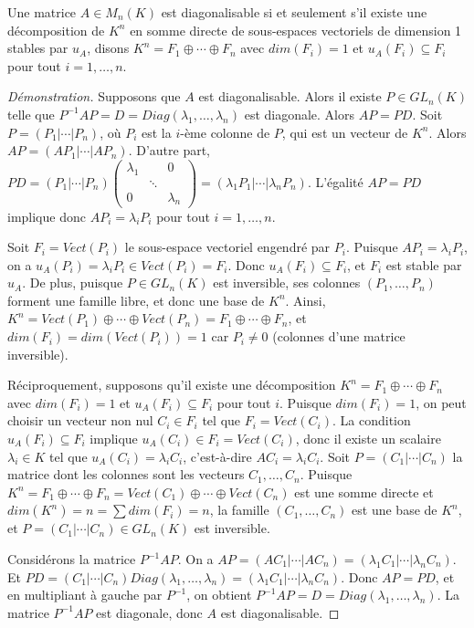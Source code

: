 \documentclass{article}
\begin{document}
\begin{corollaire}
Une matrice $A \in M_n(K)$ est diagonalisable si et seulement s'il existe une décomposition de $K^n$ en somme directe de sous-espaces vectoriels de dimension 1 stables par $u_A$, disons $K^n = F_1 \oplus \cdots \oplus F_n$ avec $dim(F_i) = 1$ et $u_A(F_i) \subseteq F_i$ pour tout $i=1, \ldots, n$.
\end{corollaire}

\begin{proof}[Démonstration]
Supposons que $A$ est diagonalisable. Alors il existe $P \in GL_n(K)$ telle que $P^{-1}AP = D = Diag(\lambda_1, \ldots, \lambda_n)$ est diagonale. Alors $AP = PD$.
Soit $P = (P_1 | \cdots | P_n)$, où $P_i$ est la $i$-ème colonne de $P$, qui est un vecteur de $K^n$. Alors $AP = (AP_1 | \cdots | AP_n)$. D'autre part, $PD = (P_1 | \cdots | P_n) \begin{pmatrix} \lambda_1 & & 0 \\ & \ddots & \\ 0 & & \lambda_n \end{pmatrix} = (\lambda_1 P_1 | \cdots | \lambda_n P_n)$.
L'égalité $AP = PD$ implique donc $AP_i = \lambda_i P_i$ pour tout $i = 1, \ldots, n$.

Soit $F_i = Vect(P_i)$ le sous-espace vectoriel engendré par $P_i$. Puisque $AP_i = \lambda_i P_i$, on a $u_A(P_i) = \lambda_i P_i \in Vect(P_i) = F_i$. Donc $u_A(F_i) \subseteq F_i$, et $F_i$ est stable par $u_A$. De plus, puisque $P \in GL_n(K)$ est inversible, ses colonnes $(P_1, \ldots, P_n)$ forment une famille libre, et donc une base de $K^n$. Ainsi, $K^n = Vect(P_1) \oplus \cdots \oplus Vect(P_n) = F_1 \oplus \cdots \oplus F_n$, et $dim(F_i) = dim(Vect(P_i)) = 1$ car $P_i \neq 0$ (colonnes d'une matrice inversible).

Réciproquement, supposons qu'il existe une décomposition $K^n = F_1 \oplus \cdots \oplus F_n$ avec $dim(F_i) = 1$ et $u_A(F_i) \subseteq F_i$ pour tout $i$. Puisque $dim(F_i) = 1$, on peut choisir un vecteur non nul $C_i \in F_i$ tel que $F_i = Vect(C_i)$. La condition $u_A(F_i) \subseteq F_i$ implique $u_A(C_i) \in F_i = Vect(C_i)$, donc il existe un scalaire $\lambda_i \in K$ tel que $u_A(C_i) = \lambda_i C_i$, c'est-à-dire $AC_i = \lambda_i C_i$.
Soit $P = (C_1 | \cdots | C_n)$ la matrice dont les colonnes sont les vecteurs $C_1, \ldots, C_n$. Puisque $K^n = F_1 \oplus \cdots \oplus F_n = Vect(C_1) \oplus \cdots \oplus Vect(C_n)$ est une somme directe et $dim(K^n) = n = \sum dim(F_i) = n$, la famille $(C_1, \ldots, C_n)$ est une base de $K^n$, et $P = (C_1 | \cdots | C_n) \in GL_n(K)$ est inversible.

Considérons la matrice $P^{-1}AP$. On a $AP = (AC_1 | \cdots | AC_n) = (\lambda_1 C_1 | \cdots | \lambda_n C_n)$. Et $PD = (C_1 | \cdots | C_n) Diag(\lambda_1, \ldots, \lambda_n) = (\lambda_1 C_1 | \cdots | \lambda_n C_n)$. Donc $AP = PD$, et en multipliant à gauche par $P^{-1}$, on obtient $P^{-1}AP = D = Diag(\lambda_1, \ldots, \lambda_n)$. La matrice $P^{-1}AP$ est diagonale, donc $A$ est diagonalisable.

\end{proof}
\end{document}
